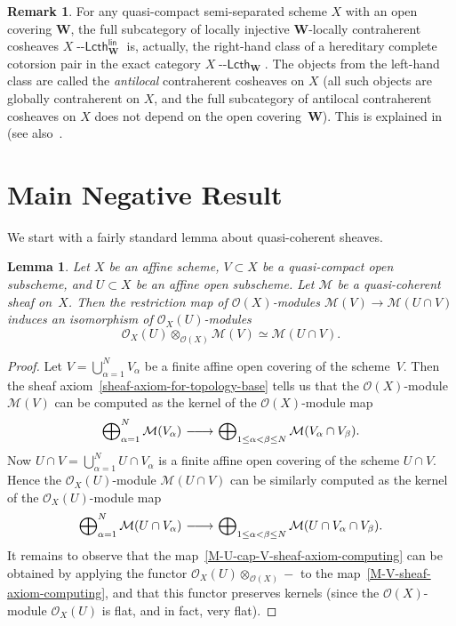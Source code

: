 \documentclass[12pt,a4paper]{amsart}
\newcommand{\+}{\nobreakdash-}
\renewcommand{\:}{\colon}
\newcommand{\rarrow}{\longrightarrow}
\newcommand{\ot}{\otimes}
\newcommand{\lrarrow}{\mskip.5\thinmuskip\relbar\joinrel\relbar
   \joinrel\rightarrow\mskip.5\thinmuskip\relax}
\newcommand{\Lcth}{{\operatorname{\mathsf{--Lcth}}}}
\newcommand{\lin}{\mathsf{lin}}
\newcommand{\bW}{\mathbf W}
\newcommand{\cO}{\mathcal O}
\newcommand{\cM}{\mathcal M}
\newcommand{\Section}[1]{\bigskip\section{#1}\medskip}
\theoremstyle{plain}
\newtheorem{lem}[thm]{Lemma}
\theoremstyle{definition}
\newtheorem{rem}[thm]{Remark}
\begin{document}
\begin{rem}
 For any quasi-compact semi-separated scheme $X$ with an open covering
$\bW$, the full subcategory of locally injective $\bW$\+locally
contraherent cosheaves $X\Lcth^\lin_\bW$ is, actually, the right-hand
class of a hereditary complete cotorsion pair in the exact category
$X\Lcth_\bW$.
 The objects from the left-hand class are called the \emph{antilocal}
contraherent cosheaves on $X$ (all such objects are globally
contraherent on $X$, and the full subcategory of antilocal contraherent
cosheaves on $X$ does not depend on the open covering~$\bW$).
 This is explained in~\cite[Section~4.3]{Pcosh} (see
also~\cite[Sections~4.4\+-4.5]{Pdomc}.
\end{rem}


\Section{Main Negative Result}

 We start with a fairly standard lemma about quasi-coherent sheaves.

\begin{lem} \label{quasi-compact-intersected-with-affine}
 Let $X$ be an affine scheme, $V\subset X$ be a quasi-compact open
subscheme, and $U\subset X$ be an affine open subscheme.
 Let\/ $\cM$ be a quasi-coherent sheaf on~$X$.
 Then the restriction map of\/ $\cO(X)$\+modules\/
$\cM(V)\rarrow\cM(U\cap V)$ induces an isomorphism of\/
$\cO_X(U)$\+modules
$$
 \cO_X(U)\ot_{\cO(X)}\cM(V)\simeq\cM(U\cap V).
$$
\end{lem}

\begin{proof}
 Let $V=\bigcup_{\alpha=1}^N V_\alpha$ be a finite affine open covering
of the scheme~$V$.
 Then the sheaf axiom~\eqref{sheaf-axiom-for-topology-base} tells us
that the $\cO(X)$\+module $\cM(V)$ can be computed as the kernel of
the $\cO(X)$\+module map
\begin{equation} \label{M-V-sheaf-axiom-computing}
 \bigoplus\nolimits_{\alpha=1}^N \cM(V_\alpha)\lrarrow
 \bigoplus\nolimits_{1\le\alpha<\beta\le N} \cM(V_\alpha\cap V_\beta).
\end{equation}
 Now $U\cap V=\bigcup_{\alpha=1}^N U\cap V_\alpha$ is a finite affine
open covering of the scheme $U\cap V$.
 Hence the $\cO_X(U)$\+module $\cM(U\cap V)$ can be similarly computed
as the kernel of the $\cO_X(U)$\+module map
\begin{equation} \label{M-U-cap-V-sheaf-axiom-computing}
 \bigoplus\nolimits_{\alpha=1}^N \cM(U\cap V_\alpha)\lrarrow
 \bigoplus\nolimits_{1\le\alpha<\beta\le N}
 \cM(U\cap V_\alpha\cap V_\beta).
\end{equation}
 It remains to observe that
the map~\eqref{M-U-cap-V-sheaf-axiom-computing} can be obtained by
applying the functor $\cO_X(U)\ot_{\cO(X)}{-}$ to
the map~\eqref{M-V-sheaf-axiom-computing}, and that this functor
preserves kernels (since the $\cO(X)$\+module $\cO_X(U)$ is flat,
and in fact, very flat).
\end{proof}
\end{document}
